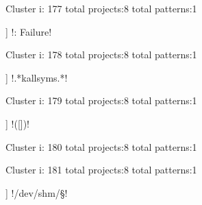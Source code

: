 Cluster i: 177
total projects:8
total patterns:1
\begin{multicols}{1}
\begin{description}[noitemsep,topsep=0pt]
\item [[8] ] \cverb!: Failure\n!
\end{description}
\end{multicols}







Cluster i: 178
total projects:8
total patterns:1
\begin{multicols}{1}
\begin{description}[noitemsep,topsep=0pt]
\item [[8] ] \cverb!.*kallsyms.*!
\end{description}
\end{multicols}







Cluster i: 179
total projects:8
total patterns:1
\begin{multicols}{1}
\begin{description}[noitemsep,topsep=0pt]
\item [[8] ] \cverb!([])!
\end{description}
\end{multicols}







Cluster i: 180
total projects:8
total patterns:1
\begin{multicols}{1}
\begin{description}[noitemsep,topsep=0pt]
\item [[8] ] \cverb!^\d[A-F]\d$!
\end{description}
\end{multicols}







Cluster i: 181
total projects:8
total patterns:1
\begin{multicols}{1}
\begin{description}[noitemsep,topsep=0pt]
\item [[8] ] \cverb!/dev/shm/\S*!
\end{description}
\end{multicols}







